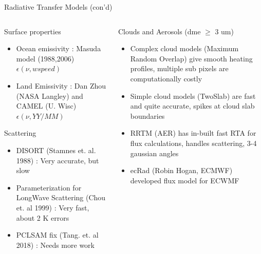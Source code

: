 \documentclass[10pt,t]{beamer}
\begin{document}

\begin{frame}[shrink=2]{Radiative Transfer Models (con'd)}
\vspace{-0.1in}
\begin{columns}

\begin{column}{0.55\columnwidth}
\begin{block}{Surface properties}
  \begin{itemize}
  \item Ocean emissivity : Masuda model (1988,2006) $\epsilon(\nu,wspeed)$
  \item Land Emissivity : Dan Zhou (NASA Langley) and CAMEL (U. Wisc) $\epsilon(\nu,YY/MM)$
  \end{itemize}
\end{block}

\begin{block}{Scattering}
  \begin{itemize}
  \item DISORT (Stamnes et. al. 1988) : Very accurate, but slow
  \item Parameterization for LongWave Scattering (Chou et. al 1999) : Very fast, about 2 K errors
  \item PCLSAM fix (Tang. et. al 2018) : Needs more work
  \end{itemize}
\end{block}
\end{column}

\begin{column}{0.55\columnwidth}
\begin{block}{Clouds and Aerosols (dme $\ge$ 3 um)}
  \begin{itemize}
  \item Complex cloud models (Maximum Random Overlap) give smooth heating profiles, multiple sub pixels are computationally costly
  \item Simple cloud models (TwoSlab) are fast and quite accurate, spikes at cloud slab boundaries
  \item RRTM (AER) has in-built fast RTA for flux calculations, handles scattering, 3-4 gaussian angles
  \item ecRad (Robin Hogan, ECMWF) developed flux model for ECWMF
  \end{itemize}
\end{block}
\end{column}
\end{columns}
\end{frame}
\end{document}
